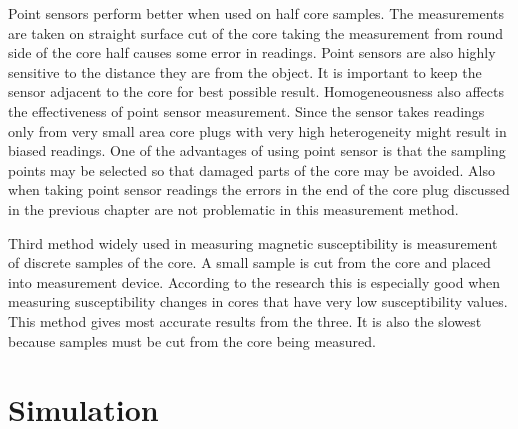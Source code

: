 \documentclass[12pt,a4paper,oneside,pdftex]{report}
\begin{document}
Point sensors perform better when used on half core samples. The measurements
are taken on straight surface cut of the core taking the measurement
from round side of the core half causes some error in readings. Point
sensors are also highly sensitive to the distance they are from the object. It
is important to keep the sensor adjacent to the core for best possible result.
Homogeneousness also affects the effectiveness of point sensor measurement.
Since the sensor takes readings only from very small area core plugs with
very high heterogeneity might result in biased readings. One of the advantages
of using point sensor is that the sampling points may be selected so
that damaged parts of the core may be avoided. Also when taking point sensor
readings the errors in the end of the core plug discussed in the previous
chapter are not problematic in this measurement method.\cite{Nowaczyk2001}

Third method widely used in measuring magnetic susceptibility is measurement
of discrete samples of the core. A small sample is cut from the
core and placed into measurement device. According to the research\cite{Nowaczyk2001} this
is especially good when measuring susceptibility changes in cores that have
very low susceptibility values. This method gives most accurate results from
the three. It is also the slowest because samples must be cut from the core
being measured.\cite{Nowaczyk2001}











% 

% 

\chapter{Simulation}
\label{chapter:simulation}
\end{document}

